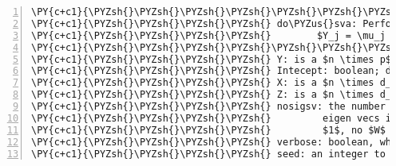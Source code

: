 \begin{Verbatim}[commandchars=\\\{\},codes={\catcode`\$=3\catcode`\^=7\catcode`\_=8},gobble=0,numbers=left,fontfamily=fvm,fontshape=n,fontsize=\footnotesize,tabsize=2]
\PY{c+c1}{\PYZsh{}\PYZsh{}\PYZsh{}\PYZsh{}\PYZsh{}\PYZsh{}\PYZsh{}\PYZsh{}\PYZsh{}\PYZsh{}\PYZsh{}\PYZsh{}\PYZsh{}\PYZsh{}\PYZsh{}\PYZsh{}\PYZsh{}\PYZsh{}\PYZsh{}\PYZsh{}\PYZsh{}\PYZsh{}\PYZsh{}\PYZsh{}\PYZsh{}\PYZsh{}\PYZsh{}\PYZsh{}\PYZsh{}\PYZsh{}\PYZsh{}\PYZsh{}\PYZsh{}\PYZsh{}\PYZsh{}\PYZsh{} FUNCTION \PYZsh{}\PYZsh{}\PYZsh{}\PYZsh{}\PYZsh{}\PYZsh{}\PYZsh{}\PYZsh{}\PYZsh{}\PYZsh{}\PYZsh{}\PYZsh{}\PYZsh{}\PYZsh{}\PYZsh{}\PYZsh{}\PYZsh{}\PYZsh{}\PYZsh{}\PYZsh{}\PYZsh{}\PYZsh{}\PYZsh{}\PYZsh{}\PYZsh{}\PYZsh{}\PYZsh{}\PYZsh{}\PYZsh{}\PYZsh{}\PYZsh{}\PYZsh{}}
\PY{c+c1}{\PYZsh{}\PYZsh{}\PYZsh{}\PYZsh{} do\PYZus{}sva: Perform SVA using the model:}
\PY{c+c1}{\PYZsh{}\PYZsh{}\PYZsh{}\PYZsh{}        $Y_j = \mu_j + X\alpha_j + Z\beta_j + W\delta_j + \mathbf{e}_j$}
\PY{c+c1}{\PYZsh{}\PYZsh{}\PYZsh{}\PYZsh{}\PYZsh{}\PYZsh{}\PYZsh{}\PYZsh{}\PYZsh{}\PYZsh{}\PYZsh{}\PYZsh{}\PYZsh{}\PYZsh{}\PYZsh{}\PYZsh{}\PYZsh{}\PYZsh{}\PYZsh{}\PYZsh{}\PYZsh{}\PYZsh{}\PYZsh{}\PYZsh{}\PYZsh{}\PYZsh{}\PYZsh{}\PYZsh{}\PYZsh{}\PYZsh{}\PYZsh{}\PYZsh{}\PYZsh{}\PYZsh{}\PYZsh{}\PYZsh{} INPUTS \PYZsh{}\PYZsh{}\PYZsh{}\PYZsh{}\PYZsh{}\PYZsh{}\PYZsh{}\PYZsh{}\PYZsh{}\PYZsh{}\PYZsh{}\PYZsh{}\PYZsh{}\PYZsh{}\PYZsh{}\PYZsh{}\PYZsh{}\PYZsh{}\PYZsh{}\PYZsh{}\PYZsh{}\PYZsh{}\PYZsh{}\PYZsh{}\PYZsh{}\PYZsh{}\PYZsh{}\PYZsh{}\PYZsh{}\PYZsh{}\PYZsh{}\PYZsh{}\PYZsh{}\PYZsh{}}
\PY{c+c1}{\PYZsh{}\PYZsh{}\PYZsh{}\PYZsh{} Y: is a $n \times p$ matrix, where each p columns are regressed}
\PY{c+c1}{\PYZsh{}\PYZsh{}\PYZsh{}\PYZsh{} Intecept: boolean; do we want to fit a mean value? (yes, in most cases)}
\PY{c+c1}{\PYZsh{}\PYZsh{}\PYZsh{}\PYZsh{} X: is a $n \times d_{\alpha}$ design matrix of the factors of interest}
\PY{c+c1}{\PYZsh{}\PYZsh{}\PYZsh{}\PYZsh{} Z: is a $n \times d_{\beta}$ design matrix of the incidental experimental factors}
\PY{c+c1}{\PYZsh{}\PYZsh{}\PYZsh{}\PYZsh{} nosigsv: the number (referred to as $H$ in some papers) of significant }
\PY{c+c1}{\PYZsh{}\PYZsh{}\PYZsh{}\PYZsh{}         eigen vecs if $NULL$, the function will determine. If less than }
\PY{c+c1}{\PYZsh{}\PYZsh{}\PYZsh{}\PYZsh{}         $1$, no $W$ computed}
\PY{c+c1}{\PYZsh{}\PYZsh{}\PYZsh{}\PYZsh{} verbose: boolean, whether the surragate variable matrix, $W$ is returned}
\PY{c+c1}{\PYZsh{}\PYZsh{}\PYZsh{}\PYZsh{} seed: an integer to feed into \PYZsq{}set.seed()\PYZsq{} for reproducable results}

\end{Verbatim}

